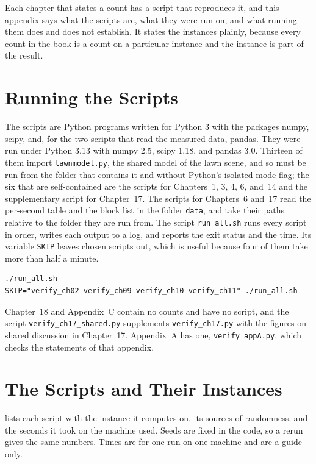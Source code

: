 \documentclass[11pt,twoside,openright]{book}
\theoremstyle{plain}
\theoremstyle{definition}
\theoremstyle{remark}
\begin{document}
Each chapter that states a count has a script that reproduces it, and this appendix says what the scripts are, what they were run on, and what running them does and does not establish. It states the instances plainly, because every count in the book is a count on a particular instance and the instance is part of the result.

\section{Running the Scripts}\label{sec:running}

The scripts are Python programs written for Python 3 with the packages numpy, scipy, and, for the two scripts that read the measured data, pandas. They were run under Python 3.13 with numpy 2.5, scipy 1.18, and pandas 3.0. Thirteen of them import \texttt{lawnmodel.py}, the shared model of the lawn scene, and so must be run from the folder that contains it and without Python's isolated-mode flag; the six that are self-contained are the scripts for Chapters~1, 3, 4, 6, and~14 and the supplementary script for Chapter~17. The scripts for Chapters~6 and~17 read the per-second table and the block list in the folder \texttt{data}, and take their paths relative to the folder they are run from. The script \texttt{run\_all.sh} runs every script in order, writes each output to a log, and reports the exit status and the time. Its variable \texttt{SKIP} leaves chosen scripts out, which is useful because four of them take more than half a minute.

\begin{verbatim}
./run_all.sh
SKIP="verify_ch02 verify_ch09 verify_ch10 verify_ch11" ./run_all.sh
\end{verbatim}

Chapter~18 and Appendix~C contain no counts and have no script, and the script \texttt{verify\_ch17\_shared.py} supplements \texttt{verify\_ch17.py} with the figures on shared discussion in Chapter~17. Appendix~A has one, \texttt{verify\_appA.py}, which checks the statements of that appendix.

\section{The Scripts and Their Instances}\label{sec:instances}

 lists each script with the instance it computes on, its sources of randomness, and the seconds it took on the machine used. Seeds are fixed in the code, so a rerun gives the same numbers. Times are for one run on one machine and are a guide only.
\end{document}
